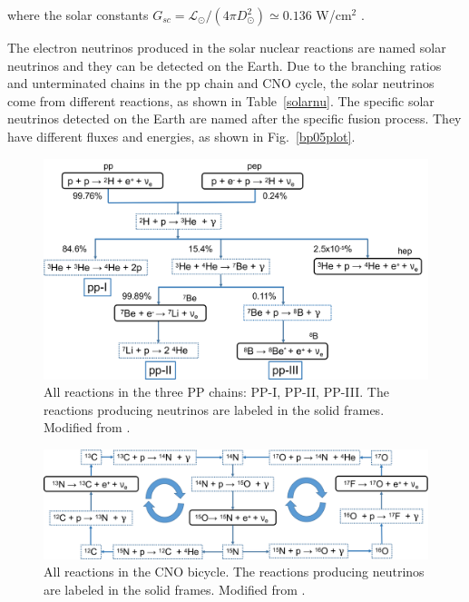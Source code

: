 where the solar constants $G_{sc}=\mathcal{L}_\odot/(4\pi D^2_\odot)\simeq 0.136$ W/cm$^2$ \cite{suekane2015neutrino}. 

The electron neutrinos produced in the solar nuclear reactions are named solar neutrinos and they can be detected on the Earth. Due to the branching ratios and unterminated chains in the pp chain and CNO cycle, the solar neutrinos come from different reactions, as shown in Table~\ref{solarnu}. The specific solar neutrinos detected on the Earth are named after the specific fusion process\cite{haxton2013solar}. They have different fluxes and energies, as shown in Fig.~\ref{bp05plot}\cite{bahcall2005new}.

\begin{figure}[htbp]
	\centering	
	\includegraphics[width=14cm]{ppChain.png}
	\caption[All reactions in the three PP chains.]{All reactions in the three PP chains: PP-I, PP-II, PP-III. The reactions producing neutrinos are labeled in the solid frames. Modified from \cite{oberauer2020solar}.}
	\label{ppChain}
\end{figure}

\begin{figure}[htbp]
	\centering	
	\includegraphics[width=14cm]{CNOcycle.png}
	\caption[All reactions in the CNO bicycle.]{All reactions in the CNO bicycle. The reactions producing neutrinos are labeled in the solid frames. Modified from \cite{oberauer2020solar}.}
	\label{CNOcycle}
\end{figure}

